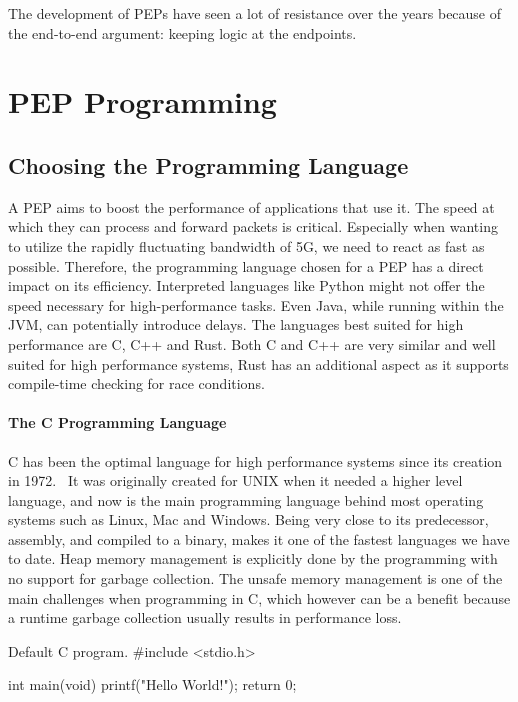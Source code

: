\documentclass[a4paper,english, 11pt]{report}
\begin{document}
The development of PEPs have seen a lot of resistance over the years because of the end-to-end argument: keeping logic at the endpoints.\\


\section{PEP Programming}

\subsection{Choosing the Programming Language}
A PEP aims to boost the performance of applications that use it. The speed at which they can process and forward packets is critical. Especially when wanting to utilize the rapidly fluctuating bandwidth of 5G, we need to react as fast as possible. Therefore, the programming language chosen for a PEP has a direct impact on its efficiency. Interpreted languages like Python might not offer the speed necessary for high-performance tasks. Even Java, while running within the JVM, can potentially introduce delays. The languages best suited for high performance are C, C++ and Rust. Both C and C++ are very similar and well suited for high performance systems, Rust has an additional aspect as it supports compile-time checking for race conditions.


\paragraph{The C Programming Language}
C has been the optimal language for high performance systems since its creation in 1972.~\cite{c_programming_language} It was originally created for UNIX when it needed a higher level language, and now is the main programming language behind most operating systems such as Linux, Mac and Windows. Being very close to its predecessor, assembly, and compiled to a binary, makes it one of the fastest languages we have to date. Heap memory management is explicitly done by the programming with no support for garbage collection. The unsafe memory management is one of the main challenges when programming in C, which however can be a benefit because a runtime garbage collection usually results in performance loss.

\begin{autonumlstlisting}[label=lst:hello_world]{Default C program.}
#include <stdio.h>

int main(void)
{
	printf("Hello World!");
	return 0;
}

\end{autonumlstlisting}
\end{document}

